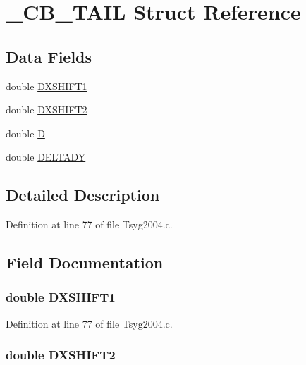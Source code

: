 \hypertarget{struct___c_b___t_a_i_l}{
\section{\_\-CB\_\-TAIL Struct Reference}
\label{struct___c_b___t_a_i_l}
}
\subsection*{Data Fields}
\begin{CompactItemize}
\item 
double \hyperlink{struct___c_b___t_a_i_l_12fe869b3516cc1eb6b73890b20335bc}{DXSHIFT1}
\item 
double \hyperlink{struct___c_b___t_a_i_l_5947c5dfec8ec63b76f2a46d1719af3c}{DXSHIFT2}
\item 
double \hyperlink{struct___c_b___t_a_i_l_d8657a5ec76e12f3066fb4b4eb75ace9}{D}
\item 
double \hyperlink{struct___c_b___t_a_i_l_cf76b5500556d063c5d6cec9508879f6}{DELTADY}
\end{CompactItemize}


\subsection{Detailed Description}


Definition at line 77 of file Tsyg2004.c.

\subsection{Field Documentation}
\hypertarget{struct___c_b___t_a_i_l_12fe869b3516cc1eb6b73890b20335bc}{
\subsubsection[{DXSHIFT1}]{\setlength{\rightskip}{0pt plus 5cm}double {\bf DXSHIFT1}}}
\label{struct___c_b___t_a_i_l_12fe869b3516cc1eb6b73890b20335bc}




Definition at line 77 of file Tsyg2004.c.\hypertarget{struct___c_b___t_a_i_l_5947c5dfec8ec63b76f2a46d1719af3c}{
\subsubsection[{DXSHIFT2}]{\setlength{\rightskip}{0pt plus 5cm}double {\bf DXSHIFT2}}}
\label{struct___c_b___t_a_i_l_5947c5dfec8ec63b76f2a46d1719af3c}




